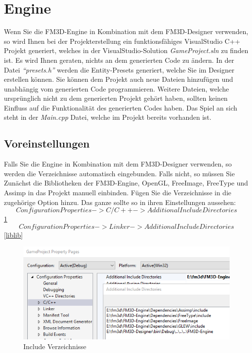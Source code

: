 \section{Engine}
\label{verwendung_engine}
Wenn Sie die FM3D-Engine in Kombination mit dem FM3D-Designer verwenden, so wird Ihnen bei der Projekterstellung ein funktionsfähiges VisualStudio C++ Projekt generiert, welches in der VisualStudio-Solution \textit{GameProject.sln} zu finden ist.
Es wird Ihnen geraten, nichts an dem generierten Code zu ändern.
In der Datei \textit{"`presets.h"'} werden die Entity-Presets generiert, welche Sie im Designer erstellen können.
Sie können dem Projekt auch neue Dateien hinzufügen und unabhängig vom generierten Code programmieren. Weitere Dateien, welche ursprünglich nicht zu dem generierten Projekt gehört haben, sollten keinen Einfluss auf die Funktionalität des generierten Codes haben. Das Spiel an sich steht in der \textit{Main.cpp} Datei, welche im Projekt bereits vorhanden ist.

\subsection{Voreinstellungen}
Falls Sie die Engine in Kombination mit dem FM3D-Designer verwenden, so werden die Verzeichnisse automatisch eingebunden. Falls nicht, so müssen Sie Zunächst die Bibliotheken der FM3D-Engine, OpenGL, FreeImage, FreeType und Assimp in das Projekt manuell einbinden. Fügen Sie die Verzeichnisse in die zugehörige Option hinzu. Das ganze sollte so in ihren Einstellungen aussehen:
$$Configuration Properties->C/C++->Additional Include Directories$$\cref{includeinc}
$$Configuration Properties->Linker->Additional Include Directories$$
\cref{liblib}

\begin{figure}
	\begin{center}
		\includegraphics[width=\textwidth]{04verwendung/Engine/include.png}
		\caption{Include Verzeichnisse}\label{includeinc}
	\end{center}
\end{figure}

